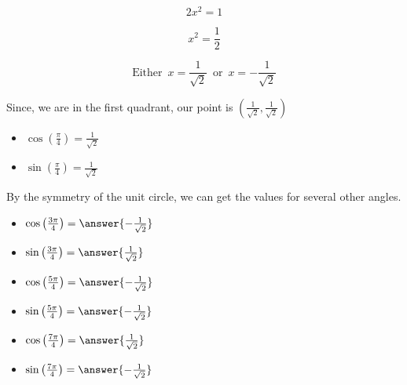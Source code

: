 \documentclass{ximera}
\begin{document}
\[  2  x^2 = 1 \]

\[  x^2 = \frac{1}{2} \]


\[  \text{Either } \, x = \frac{1}{\sqrt{2}} \, \text{ or } \,  x = -\frac{1}{\sqrt{2}}   \]


Since, we are in the first quadrant, our point is $\left(\frac{1}{\sqrt{2}}, \frac{1}{\sqrt{2}}\right)$


\begin{itemize}
\item $\cos\left(\frac{\pi}{4}\right) = \frac{1}{\sqrt{2}}$ \\
\item $\sin\left(\frac{\pi}{4}\right) = \frac{1}{\sqrt{2}}$
\end{itemize}




By the symmetry of the unit circle, we can get the values for several other angles.




\begin{question}



\begin{itemize}
\item $\cos\left(\frac{3\pi}{4}\right) = \answer{-\frac{1}{\sqrt{2}}}$ \\
\item $\sin\left(\frac{3\pi}{4}\right) = \answer{\frac{1}{\sqrt{2}}}$
\end{itemize}



\end{question}





\begin{question}



\begin{itemize}
\item $\cos\left(\frac{5\pi}{4}\right) = \answer{-\frac{1}{\sqrt{2}}}$ \\
\item $\sin\left(\frac{5\pi}{4}\right) = \answer{-\frac{1}{\sqrt{2}}}$
\end{itemize}



\end{question}





\begin{question}



\begin{itemize}
\item $\cos\left(\frac{7\pi}{4}\right) = \answer{\frac{1}{\sqrt{2}}}$ \\
\item $\sin\left(\frac{7\pi}{4}\right) = \answer{-\frac{1}{\sqrt{2}}}$
\end{itemize}



\end{question}
\end{document}
